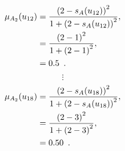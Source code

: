 \documentclass[a4paper,openany]{book}
\begin{document}
				\begin{align}
					\mu_{A_2}(u_{12}) &= \frac{\left(2-s_A(u_{12})\right)^2}{1 + \left(2-s_A(u_{12})\right)^2} ,\\
					&= \frac{\left(2-1\right)^2}{1 + \left(2-1\right)^2} \notag ,\\
					&= 0.5 \enspace. \notag
				\end{align}
				\[
					\vdots
				\]
				\begin{align}
					\mu_{A_2}(u_{18}) &= \frac{\left(2-s_A(u_{18})\right)^2}{1 + \left(2-s_A(u_{18})\right)^2} ,\\
					&= \frac{\left(2-3\right)^2}{1 + \left(2-3\right)^2} \notag ,\\
					&= 0.50 \enspace. \notag
				\end{align}
\end{document}
